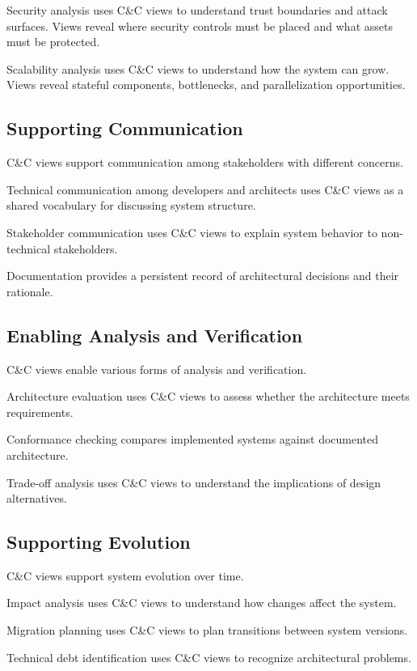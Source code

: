 \documentclass[11pt]{article}
\begin{document}
Security analysis uses C\&C views to understand trust boundaries and attack surfaces. Views reveal where security controls must be placed and what assets must be protected.

Scalability analysis uses C\&C views to understand how the system can grow. Views reveal stateful components, bottlenecks, and parallelization opportunities.

\subsection{Supporting Communication}

C\&C views support communication among stakeholders with different concerns.

Technical communication among developers and architects uses C\&C views as a shared vocabulary for discussing system structure.

Stakeholder communication uses C\&C views to explain system behavior to non-technical stakeholders.

Documentation provides a persistent record of architectural decisions and their rationale.

\subsection{Enabling Analysis and Verification}

C\&C views enable various forms of analysis and verification.

Architecture evaluation uses C\&C views to assess whether the architecture meets requirements.

Conformance checking compares implemented systems against documented architecture.

Trade-off analysis uses C\&C views to understand the implications of design alternatives.

\subsection{Supporting Evolution}

C\&C views support system evolution over time.

Impact analysis uses C\&C views to understand how changes affect the system.

Migration planning uses C\&C views to plan transitions between system versions.

Technical debt identification uses C\&C views to recognize architectural problems.
\end{document}
